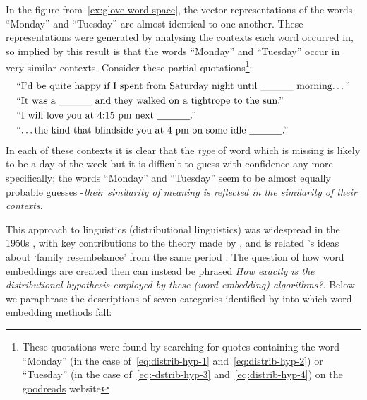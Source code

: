 \documentclass{ucetd}
\begin{document}
\begin{example}
  In the figure from~\autoref{ex:glove-word-space}, the vector representations of the words ``Monday'' and ``Tuesday'' are almost identical to one another. These representations were generated by analysing the contexts each word occurred in, so implied by this result is that the words ``Monday'' and ``Tuesday'' occur in very similar contexts. Consider these partial quotations\footnote{These quotations were found by searching for quotes containing the word ``Monday'' (in the case of~\eqref{eq:distrib-hyp-1} and~\eqref{eq:distrib-hyp-2}) or ``Tuesday'' (in the case of~\eqref{eq:-dstrib-hyp-3} and~\eqref{eq:distrib-hyp-4}) on the \href{https://www.goodreads.com}{goodreads} website}:
  \begin{align}
    &\text{``I'd be quite happy if I spent from Saturday night until \underline{~~~~~~~~~~} morning\dots''}\label{eq:distrib-hyp-1}\\
    &\text{``It was a \underline{~~~~~~~~~~} and they walked on a tightrope to the sun.''}\label{eq:distrib-hyp-2}\\
    &\text{``I will love you at 4:15 pm next \underline{~~~~~~~~~~}.''}\label{eq:distrib-hyp-3}\\
    &\text{``\dots the kind that blindside you at 4 pm on some idle \underline{~~~~~~~~~~}.''}\label{eq:distrib-hyp-4}
  \end{align}
  In each of these contexts it is clear that the \emph{type} of word which is missing is likely to be a day of the week but it is difficult to guess with confidence any more specifically; the words ``Monday'' and ``Tuesday'' seem to be almost equally probable guesses -\emph{their similarity of meaning is reflected in the similarity of their contexts}.
\end{example}
This approach to linguistics (distributional linguistics) was widespread in the 1950s \parencite{jurafsky21-speec}, with key contributions to the theory made by \textcite{joos-1950-description-of-language, harris-1954-distrib-struct, firth-1957-a-syn-of-lin}, and is related \citeauthor{wittgenstein53-philos}'s \parencite*{wittgenstein53-philos} ideas about `family resembelance' from the same period \parencite{turney10-from-frequen-to-meanin}.
The question of how word embeddings are created then can instead be phrased \emph{How exactly is the distributional hypothesis employed by these (word embedding) algorithms?}. Below we paraphrase the descriptions of seven categories identified by \textcite{wang-2019-evaluating} into which word embedding methods fall:
\end{document}
